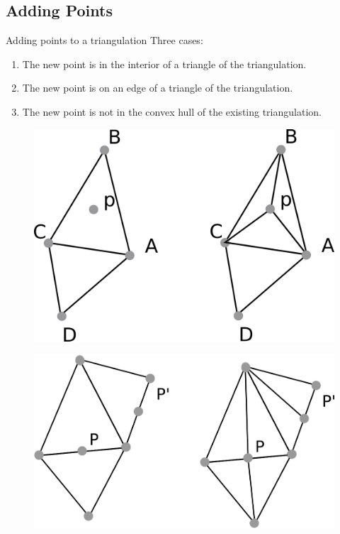 \documentclass[18pt]{beamer}
\begin{document}
\subsection{Adding Points}

\begin{frame}{Adding points to a triangulation}
Three cases:

\begin{enumerate}
\item<1-> The new point is in the interior of a triangle of the triangulation.
\item<2-> The new point is on an edge of a triangle of the triangulation.
\item<3-> The new point is not in the convex hull of the existing triangulation.
\end{enumerate}

\begin{overprint}
  \begin{figure}
\centering
\includegraphics[scale=0.8]{adding}
\end{figure}
  
  \begin{figure}
\centering
\includegraphics[scale=0.8]{adding2}
\end{figure}
  

\end{overprint}
\end{frame}
\end{document}
